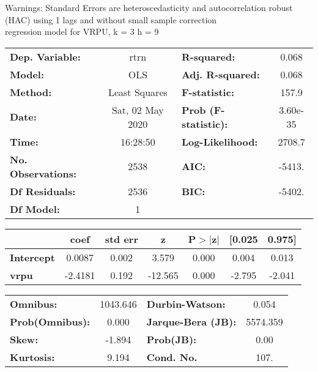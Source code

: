 Warnings: \newline
 [1] Standard Errors are heteroscedasticity and autocorrelation robust (HAC) using 1 lags and without small sample correction\\ 

regression model for VRPU, k = 3 h = 9\begin{center}
\begin{tabular}{lclc}
\toprule
\textbf{Dep. Variable:}    &       rtrn       & \textbf{  R-squared:         } &     0.068   \\
\textbf{Model:}            &       OLS        & \textbf{  Adj. R-squared:    } &     0.068   \\
\textbf{Method:}           &  Least Squares   & \textbf{  F-statistic:       } &     157.9   \\
\textbf{Date:}             & Sat, 02 May 2020 & \textbf{  Prob (F-statistic):} &  3.60e-35   \\
\textbf{Time:}             &     16:28:50     & \textbf{  Log-Likelihood:    } &    2708.7   \\
\textbf{No. Observations:} &        2538      & \textbf{  AIC:               } &    -5413.   \\
\textbf{Df Residuals:}     &        2536      & \textbf{  BIC:               } &    -5402.   \\
\textbf{Df Model:}         &           1      & \textbf{                     } &             \\
\bottomrule
\end{tabular}
\begin{tabular}{lcccccc}
                   & \textbf{coef} & \textbf{std err} & \textbf{z} & \textbf{P$> |$z$|$} & \textbf{[0.025} & \textbf{0.975]}  \\
\midrule
\textbf{Intercept} &       0.0087  &        0.002     &     3.579  &         0.000        &        0.004    &        0.013     \\
\textbf{vrpu}      &      -2.4181  &        0.192     &   -12.565  &         0.000        &       -2.795    &       -2.041     \\
\bottomrule
\end{tabular}
\begin{tabular}{lclc}
\textbf{Omnibus:}       & 1043.646 & \textbf{  Durbin-Watson:     } &    0.054  \\
\textbf{Prob(Omnibus):} &   0.000  & \textbf{  Jarque-Bera (JB):  } & 5574.359  \\
\textbf{Skew:}          &  -1.894  & \textbf{  Prob(JB):          } &     0.00  \\
\textbf{Kurtosis:}      &   9.194  & \textbf{  Cond. No.          } &     107.  \\
\bottomrule
\end{tabular}
\end{center}

